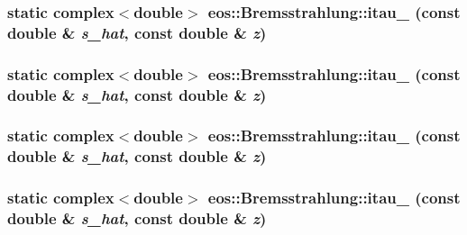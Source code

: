 \label{structeos_1_1Bremsstrahlung_af39debb09760b0c3b6983ac6d7e28d05}
\hypertarget{structeos_1_1Bremsstrahlung_a34453235bd8805b9cb261261fc9a3b93}{
\subsubsection[{itau\_\-22}]{\setlength{\rightskip}{0pt plus 5cm}static complex$<$double$>$ eos::Bremsstrahlung::itau\_ (const double \& {\em s\_\-hat}, \/  const double \& {\em z})}}
\label{structeos_1_1Bremsstrahlung_a34453235bd8805b9cb261261fc9a3b93}
\hypertarget{structeos_1_1Bremsstrahlung_a07f9c13a763df1b9a0ce102bdc1159d2}{
\subsubsection[{itau\_\-27}]{\setlength{\rightskip}{0pt plus 5cm}static complex$<$double$>$ eos::Bremsstrahlung::itau\_ (const double \& {\em s\_\-hat}, \/  const double \& {\em z})}}
\label{structeos_1_1Bremsstrahlung_a07f9c13a763df1b9a0ce102bdc1159d2}
\hypertarget{structeos_1_1Bremsstrahlung_a9a6a2545413301f3b2bcca85e4c6f909}{
\subsubsection[{itau\_\-28}]{\setlength{\rightskip}{0pt plus 5cm}static complex$<$double$>$ eos::Bremsstrahlung::itau\_ (const double \& {\em s\_\-hat}, \/  const double \& {\em z})}}
\label{structeos_1_1Bremsstrahlung_a9a6a2545413301f3b2bcca85e4c6f909}
\hypertarget{structeos_1_1Bremsstrahlung_add6d9efe0e4ae23f5751eb78d09c1225}{
\subsubsection[{itau\_\-29}]{\setlength{\rightskip}{0pt plus 5cm}static complex$<$double$>$ eos::Bremsstrahlung::itau\_ (const double \& {\em s\_\-hat}, \/  const double \& {\em z})}}
